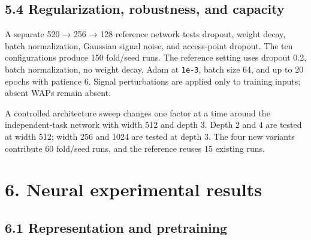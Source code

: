 \documentclass[
  10pt,
  a4paper,
]{article}
\begin{document}
\subsection{5.4 Regularization, robustness, and
capacity}\label{regularization-robustness-and-capacity}

A separate 520 → 256 → 128 reference network tests dropout, weight
decay, batch normalization, Gaussian signal noise, and access-point
dropout. The ten configurations produce 150 fold/seed runs. The
reference setting uses dropout 0.2, batch normalization, no weight
decay, Adam at \texttt{1e-3}, batch size 64, and up to 20 epochs with
patience 6. Signal perturbations are applied only to training inputs;
absent WAPs remain absent.

A controlled architecture sweep changes one factor at a time around the
independent-task network with width 512 and depth 3. Depth 2 and 4 are
tested at width 512; width 256 and 1024 are tested at depth 3. The four
new variants contribute 60 fold/seed runs, and the reference reuses 15
existing runs.

\section{6. Neural experimental
results}\label{neural-experimental-results}

\subsection{6.1 Representation and
pretraining}\label{representation-and-pretraining}
\end{document}
